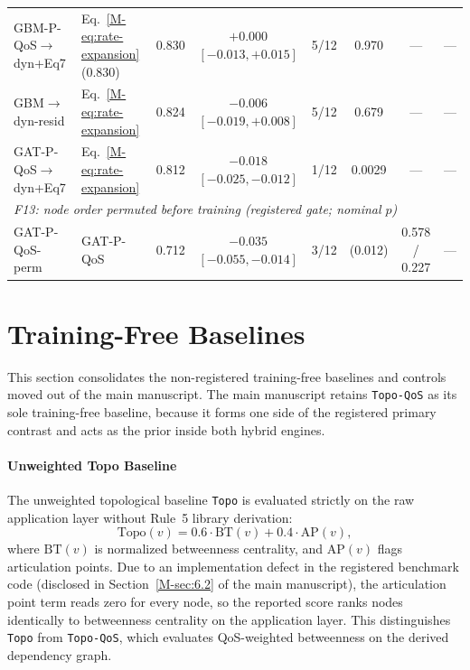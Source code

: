 \documentclass[preprint,3p]{elsarticle}
\begin{document}
\begin{table}[htbp]
{\begin{tabular}{llcccccc}
GBM-P-QoS$\to$dyn+Eq7 & Eq.~\eqref{M-eq:rate-expansion} ($0.830$) & 0.830 & $+0.000$ $[-0.013, +0.015]$ & 5/12 & 0.970 & --- & --- \\
GBM$\to$dyn-resid & Eq.~\eqref{M-eq:rate-expansion} & 0.824 & $-0.006$ $[-0.019, +0.008]$ & 5/12 & 0.679 & --- & --- \\
GAT-P-QoS$\to$dyn+Eq7 & Eq.~\eqref{M-eq:rate-expansion} & 0.812 & $-0.018$ $[-0.025, -0.012]$ & 1/12 & 0.0029 & --- & --- \\
\midrule
\multicolumn{8}{l}{\textit{F13: node order permuted before training (registered gate; nominal $p$)}} \\
GAT-P-QoS-perm & GAT-P-QoS & 0.712 & $-0.035$ $[-0.055, -0.014]$ & 3/12 & (0.012) & 0.578 / 0.227 & --- \\
\bottomrule
\end{tabular}%
}
\end{table}



\section{Training-Free Baselines}
\label{supp:baselines}

This section consolidates the non-registered training-free baselines and controls moved out of the main manuscript. The main manuscript retains \texttt{Topo-QoS} as its sole training-free baseline, because it forms one side of the registered primary contrast and acts as the prior inside both hybrid engines.

\paragraph{Unweighted Topo Baseline}
The unweighted topological baseline \texttt{Topo} is evaluated strictly on the raw application layer without Rule~5 library derivation:
\begin{equation}
\label{eq:topo-supp}
\text{Topo}(v) = 0.6 \cdot \text{BT}(v) + 0.4 \cdot \text{AP}(v),
\end{equation}
where $\text{BT}(v)$ is normalized betweenness centrality, and $\text{AP}(v)$ flags articulation points. Due to an implementation defect in the registered benchmark code (disclosed in Section~\ref{M-sec:6.2} of the main manuscript), the articulation point term reads zero for every node, so the reported score ranks nodes identically to betweenness centrality on the application layer. This distinguishes \texttt{Topo} from \texttt{Topo-QoS}, which evaluates QoS-weighted betweenness on the derived dependency graph.
\end{document}
